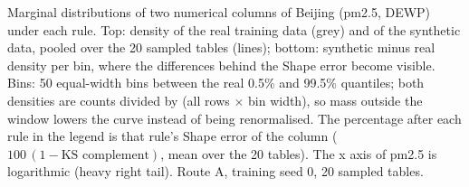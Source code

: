 Marginal distributions of two numerical columns of Beijing (pm2.5, DEWP) under each rule. Top: density of the real training data (grey) and of the synthetic data, pooled over the 20 sampled tables (lines); bottom: synthetic minus real density per bin, where the differences behind the Shape error become visible. Bins: 50 equal-width bins between the real 0.5\% and 99.5\% quantiles; both densities are counts divided by (all rows $\times$ bin width), so mass outside the window lowers the curve instead of being renormalised. The percentage after each rule in the legend is that rule's Shape error of the column ($100\,(1-\text{KS complement})$, mean over the 20 tables). The x axis of pm2.5 is logarithmic (heavy right tail). Route A, training seed 0, 20 sampled tables.
